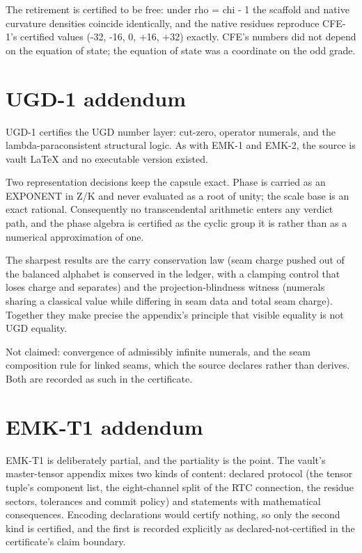The retirement is certified to be free: under rho = chi - 1 the scaffold
and native curvature densities coincide identically, and the native
residues reproduce CFE-1's certified values (-32, -16, 0, +16, +32)
exactly. CFE's numbers did not depend on the equation of state; the
equation of state was a coordinate on the odd grade.

\hypertarget{ugd-1-addendum}{%
\section{UGD-1 addendum}\label{ugd-1-addendum}}

UGD-1 certifies the UGD number layer: cut-zero, operator numerals, and
the lambda-paraconsistent structural logic. As with EMK-1 and EMK-2, the
source is vault LaTeX and no executable version existed.

Two representation decisions keep the capsule exact. Phase is carried as
an EXPONENT in Z/K and never evaluated as a root of unity; the scale base
is an exact rational. Consequently no transcendental arithmetic enters
any verdict path, and the phase algebra is certified as the cyclic group
it is rather than as a numerical approximation of one.

The sharpest results are the carry conservation law (seam charge pushed
out of the balanced alphabet is conserved in the ledger, with a clamping
control that loses charge and separates) and the projection-blindness
witness (numerals sharing a classical value while differing in seam data
and total seam charge). Together they make precise the appendix's
principle that visible equality is not UGD equality.

Not claimed: convergence of admissibly infinite numerals, and the seam
composition rule for linked seams, which the source declares rather than
derives. Both are recorded as such in the certificate.

\hypertarget{emk-t1-addendum}{%
\section{EMK-T1 addendum}\label{emk-t1-addendum}}

EMK-T1 is deliberately partial, and the partiality is the point. The
vault's master-tensor appendix mixes two kinds of content: declared
protocol (the tensor tuple's component list, the eight-channel split of
the RTC connection, the residue sectors, tolerances and commit policy)
and statements with mathematical consequences. Encoding declarations
would certify nothing, so only the second kind is certified, and the
first is recorded explicitly as declared-not-certified in the
certificate's claim boundary.

